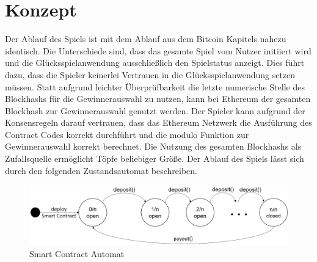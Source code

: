 \section{Konzept} \label{eth_konzept}

Der Ablauf des Spiels ist mit dem Ablauf aus dem Bitcoin Kapitels nahezu identisch. Die Unterschiede sind, dass das gesamte Spiel vom Nutzer initiiert wird und die Glücksspielanwendung ausschließlich den Spielstatus anzeigt. Dies führt dazu, dass die Spieler keinerlei Vertrauen in die Glücksspielanwendung setzen müssen. Statt aufgrund leichter Überprüfbarkeit die letzte numerische Stelle des Blockhashs für die Gewinnerauswahl zu nutzen, kann bei Ethereum der gesamten Blockhash zur Gewinnerauswahl genutzt werden. Der Spieler kann aufgrund der Konsensregeln darauf vertrauen, dass das Ethereum Netzwerk die Ausführung des Contract Codes korrekt durchführt und die modulo Funktion zur Gewinnerauswahl korrekt berechnet. Die Nutzung des gesamten Blockhashs als Zufallsquelle ermöglicht Töpfe beliebiger Größe. 
Der Ablauf des Spiels lässt sich durch den folgenden Zustandsautomat beschreiben.

\begin{figure}[H]
\centering
\includegraphics[width=1\linewidth]{Figures/umsetzung_eth/smart_contract_automat_idea}
\decoRule
\caption{Smart Contract Automat}
\label{fig:smart_contract_automat_idea}
\end{figure}

